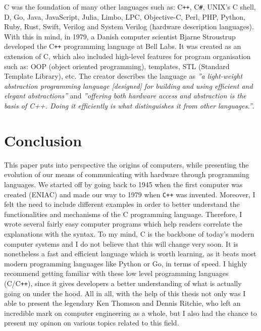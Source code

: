 \documentclass[12pt]{article}
\begin{document}
C was the foundation of many other languages such as: C\texttt{++}, C\texttt{\#}, UNIX’s C shell, D, Go, Java, JavaScript, Julia, Limbo, LPC, Objective-C, Perl, PHP, Python, Ruby, Rust, Swift, Verilog and System Verilog (hardware description languages). With this in mind, in 1979, a Danish computer scientist Bjarne Stroustrup developed the C\texttt{++} programming language at Bell Labs. It was created as an extension of C, which also included high-level features for program organisation such as: OOP (object oriented programming), templates, STL (Standard Template Library), etc. The creator describes the language as \textit{”a light-weight abstraction programming language [designed] for building and using efficient and elegant abstractions”} and \textit{”offering both hardware access and abstraction is the basis of C++. Doing it efficiently is what distinguishes it from other languages.”}. 

\newpage
\section{Conclusion}
This paper puts into perspective the origins of computers, while presenting the evolution of our means of communicating with hardware through programming languages. We started off by going back to 1945 when the first computer was created (ENIAC) and made our way to 1979 when \texttt{C++} was invented. Moreover, I felt the need to include different examples in order to better understand the functionalities and mechanisms of the C programming language. Therefore, I wrote several fairly easy computer programs which help readers correlate the explanations with the syntax. \newline\newline To my mind, C is the backbone of today’s modern computer systems and I do not believe that this will change very soon. It is nonetheless a fast and efficient language which is worth learning, as it beats most modern programming languages like Python or Go, in terms of speed. I highly recommend getting familiar with these low level programming languages (C/C\texttt{++}), since it gives developers a better understanding of what is actually going on under the hood. \newline\newline All in all, with the help of this thesis not only was I able to present the legendary Ken Thomson and Dennis Ritchie, who left an incredible mark on computer engineering as a whole, but I also had the chance to present my opinon on various topics related to this field.
\end{document}
